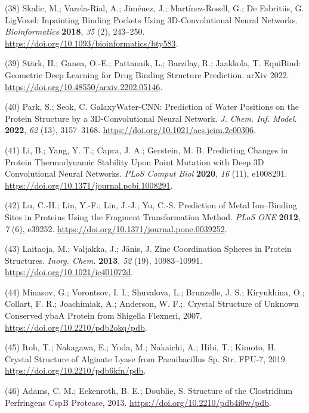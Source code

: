 \documentclass[  ASAPversion,
  ,
  9pt]{elife}
\newenvironment{cslreferences}%
  {}%
  {\par}
\begin{document}
\begin{cslreferences}
\leavevmode\hypertarget{ref-mVGaXlum}{}%
(38) Skalic, M.; Varela-Rial, A.; Jiménez, J.; Martínez-Rosell, G.; De Fabritiis, G. LigVoxel: Inpainting Binding Pockets Using 3D-Convolutional Neural Networks. \emph{Bioinformatics} \textbf{2018}, \emph{35} (2), 243--250. \url{https://doi.org/10.1093/bioinformatics/bty583}.

\leavevmode\hypertarget{ref-13hjzBbje}{}%
(39) Stärk, H.; Ganea, O.-E.; Pattanaik, L.; Barzilay, R.; Jaakkola, T. EquiBind: Geometric Deep Learning for Drug Binding Structure Prediction. arXiv 2022. \url{https://doi.org/10.48550/arxiv.2202.05146}.

\leavevmode\hypertarget{ref-9UNjBvCL}{}%
(40) Park, S.; Seok, C. GalaxyWater-CNN: Prediction of Water Positions on the Protein Structure by a 3D-Convolutional Neural Network. \emph{J. Chem. Inf. Model.} \textbf{2022}, \emph{62} (13), 3157--3168. \url{https://doi.org/10.1021/acs.jcim.2c00306}.

\leavevmode\hypertarget{ref-9K88m3YT}{}%
(41) Li, B.; Yang, Y. T.; Capra, J. A.; Gerstein, M. B. Predicting Changes in Protein Thermodynamic Stability Upon Point Mutation with Deep 3D Convolutional Neural Networks. \emph{PLoS Comput Biol} \textbf{2020}, \emph{16} (11), e1008291. \url{https://doi.org/10.1371/journal.pcbi.1008291}.

\leavevmode\hypertarget{ref-k859wJxx}{}%
(42) Lu, C.-H.; Lin, Y.-F.; Lin, J.-J.; Yu, C.-S. Prediction of Metal Ion--Binding Sites in Proteins Using the Fragment Transformation Method. \emph{PLoS ONE} \textbf{2012}, \emph{7} (6), e39252. \url{https://doi.org/10.1371/journal.pone.0039252}.

\leavevmode\hypertarget{ref-Wt0ducot}{}%
(43) Laitaoja, M.; Valjakka, J.; Jänis, J. Zinc Coordination Spheres in Protein Structures. \emph{Inorg. Chem.} \textbf{2013}, \emph{52} (19), 10983--10991. \url{https://doi.org/10.1021/ic401072d}.

\leavevmode\hypertarget{ref-Qubi5dZD}{}%
(44) Minasov, G.; Vorontsov, I. I.; Shuvalova, L.; Brunzelle, J. S.; Kiryukhina, O.; Collart, F. R.; Joachimiak, A.; Anderson, W. F.;. Crystal Structure of Unknown Conserved ybaA Protein from Shigella Flexneri, 2007. \url{https://doi.org/10.2210/pdb2okq/pdb}.

\leavevmode\hypertarget{ref-g7lHXZp5}{}%
(45) Itoh, T.; Nakagawa, E.; Yoda, M.; Nakaichi, A.; Hibi, T.; Kimoto, H. Crystal Structure of Alginate Lyase from Paenibacillus Sp. Str. FPU-7, 2019. \url{https://doi.org/10.2210/pdb6kfn/pdb}.

\leavevmode\hypertarget{ref-w9ECLZDp}{}%
(46) Adams, C. M.; Eckenroth, B. E.; Doublie, S. Structure of the Clostridium Perfringens CspB Protease, 2013. \url{https://doi.org/10.2210/pdb4i0w/pdb}.


\end{cslreferences}
\end{document}
